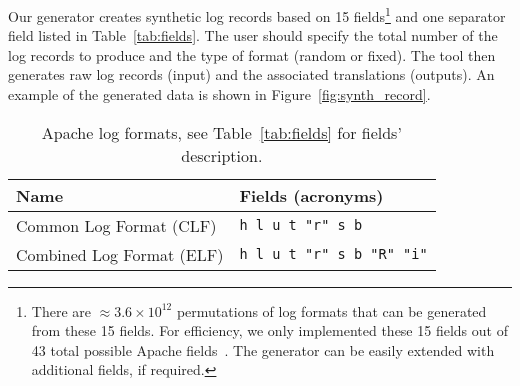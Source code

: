 \documentclass{article}
\begin{document}
Our generator creates synthetic log records based on 15 fields\footnote{There are $\approx 3.6 \times 10^{12}$ permutations of log formats that can be generated from these 15 fields. For efficiency, we only implemented these 15 fields out of 43 total possible Apache fields~\cite{apachemodlog:online}. The generator can be easily extended with additional fields, if required. } and one separator field listed in Table~\ref{tab:fields}. The user should specify the total number of the log records to produce and the type of format (random or fixed). 
The tool then generates raw log records (input) and the associated translations (outputs). An example of the generated data is shown in Figure~\ref{fig:synth_record}.

\begin{table}[bt]
\caption{ Apache log formats, see Table~\ref{tab:fields} for fields' description.}
\label{tab:formats}
\centering
\begin{tabular}{@{}ll@{}}
\toprule
Name                             & Fields (acronyms)       \\ 
\midrule
Common Log Format (CLF)          & \texttt{h l u t "r" s b}         \\
Combined Log Format (ELF) & \texttt{h l u t "r" s b "R" "i"} \\ 
\bottomrule
\end{tabular}
\end{table}
\end{document}
